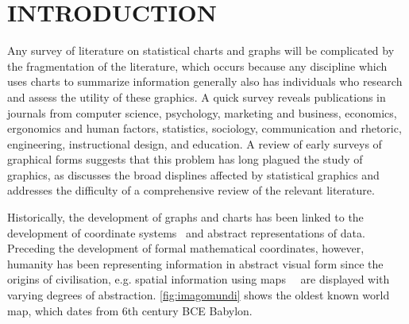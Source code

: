 \documentclass[letterpaper]{ar-1col}\usepackage[]{graphicx}\usepackage[]{color}
\newcommand{\svp}[1]{\textcolor{blue}{#1}}
\begin{document}
\section{INTRODUCTION}
Any survey of literature on statistical charts and graphs will be complicated by the fragmentation of the literature, which occurs because any discipline which uses charts to summarize information generally also has individuals who research and assess the utility of these graphics. A quick survey reveals publications in journals from computer science, psychology, marketing and business, economics, ergonomics and human factors, statistics, sociology, communication and rhetoric, engineering, instructional design, and education. A review of early surveys of graphical forms suggests that this problem has long plagued the study of graphics, as \citet{funkhouserHistoricalDevelopmentGraphical1937} discusses the broad displines affected by statistical graphics and  \citet{kruskalVisionsMapsGraphs1977} addresses the difficulty of a comprehensive review of the relevant literature.


Historically, the development of graphs and charts has been linked to the development of coordinate systems~\citep{fienbergGraphicalMethodsStatistics1979,benigerQuantitativeGraphicsStatistics1978,funkhouserHistoricalDevelopmentGraphical1937} and abstract representations of data. Preceding the development of formal mathematical coordinates, however, humanity has been representing information in abstract visual form since the origins of civilisation, e.g. spatial information using maps~~\citep{smithImagoMundiLogo1996} are displayed with varying degrees of abstraction. \autoref{fig:imagomundi} shows the oldest known world map, which dates from 6th century BCE Babylon. %
\end{document}
